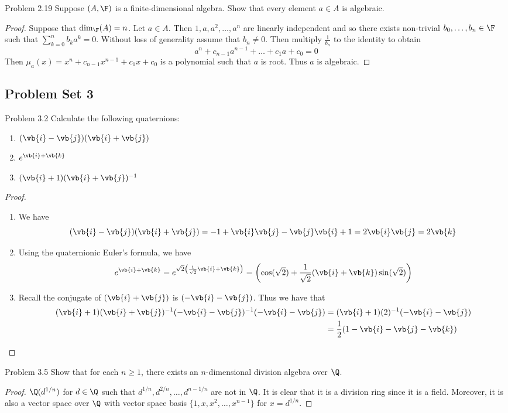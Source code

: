 \documentclass[a4paper]{article}
\begin{document}
\begin{ex}{Problem 2.19}{} Suppose $(A,\F)$ is a finite-dimensional algebra. Show that every element $a\in A$ is algebraic. 
\begin{proof}
Suppose that $\dim_\F(A)=n$. Let $a\in A$. Then $1,a,a^2,\dots,a^n$ are linearly independent and so there exists non-trivial $b_0,\dots,b_n\in\F$ such that $\sum_{k=0}^nb_ka^k=0$. Without loss of generality assume that $b_n\neq 0$. Then multiply $\frac{1}{b_n}$ to the identity to obtain $$a^n+c_{n-1}a^{n-1}+\dots+c_1a+c_0=0$$ Then $\mu_a(x)=x^n+c_{n-1}x^{n-1}+c_1x+c_0$ is a polynomial such that $a$ is root. Thus $a$ is algebraic. 
\end{proof}
\end{ex}

\subsection{Problem Set 3}
\begin{ex}{Problem 3.2}{} Calculate the following quaternions: 
\begin{enumerate}
\item $(\vb{i}-\vb{j})(\vb{i}+\vb{j})$
\item $e^{\vb{i}+\vb{k}}$
\item $(\vb{i}+1)(\vb{i}+\vb{j})^{-1}$
\end{enumerate} 
\begin{proof}~\\
\begin{enumerate}
\item We have $$(\vb{i}-\vb{j})(\vb{i}+\vb{j})=-1+\vb{i}\vb{j}-\vb{j}\vb{i}+1=2\vb{i}\vb{j}=2\vb{k}$$
\item Using the quaternionic Euler's formula, we have $$e^{\vb{i}+\vb{k}}=e^{\sqrt{2}\left(\frac{1}{\sqrt{2}}\vb{i}+\vb{k}\right)}=\left(\cos(\sqrt{2})+\frac{1}{\sqrt{2}}(\vb{i}+\vb{k})\sin(\sqrt{2})\right)$$
\item Recall the conjugate of $(\vb{i}+\vb{j})$ is $(-\vb{i}-\vb{j})$. Thus we have that 
\begin{align*}
(\vb{i}+1)(\vb{i}+\vb{j})^{-1}(-\vb{i}-\vb{j})^{-1}(-\vb{i}-\vb{j})&=(\vb{i}+1)(2)^{-1}(-\vb{i}-\vb{j})\\
&=\frac{1}{2}(1-\vb{i}-\vb{j}-\vb{k})
\end{align*}
\end{enumerate}
\end{proof}
\end{ex}

\begin{ex}{Problem 3.5}{} Show that for each $n\geq 1$, there exists an $n$-dimensional division algebra over $\Q$. 
\begin{proof}
$\Q(d^{1/n})$ for $d\in\Q$ such that $d^{1/n},d^{2/n},\dots,d^{n-1/n}$ are not in $\Q$. It is clear that it is a division ring since it is a field. Moreover, it is also a vector space over $\Q$ with vector space basis $\{1,x,x^2,\dots,x^{n-1}\}$ for $x=d^{1/n}$. 
\end{proof}
\end{ex}
\end{document}
